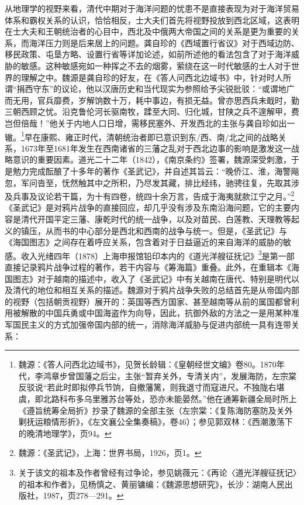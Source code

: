 \documentclass[a4paper, 12pt, openright]{ctexbook}
\begin{document}
从地理学的视野来看，清代中期对于海洋问题的忧患不是直接表现为对于海洋贸易体系和霸权关系的认识，恰恰相反，士大夫们首先将视野投放到西北区域，这表明在士大夫和王朝统治者的心目中，西北及中俄两大帝国之间的关系是更为重要的关系，而海洋压力则是后来居上的问题。龚自珍的《西域置行省议》对于西域边防、移民政策、屯垦方略、设置行省等详加论述，如前所述他的看法包含了对于海洋威胁的敏感。这种敏感宛如一种挥之不去的烟雾，萦绕在这一时代敏感的士人对于世界的理解之中。魏源是龚自珍的好友，在《答人问西北边域书》中，针对时人所谓“捐西守东”的议论，他以汉唐历史和当代现实为参照给予尖锐批驳：“或谓地广而无用，官兵靡费，岁解饷数十万，耗中事边，有损无益。曾亦思西兵未戢时，勤三朝西顾之忧。沿克鲁伦河长驱南牧，蹂至大同、归化城，甘陕之兵不遑解甲，费岂但倍哉！”他关于内地人口日增，需移民塞外、开发西北的主张与龚自珍如出一辙。\footnote{魏源：《答人问西北边域书》，见贺长龄辑：《皇朝经世文编》卷80。1870年代，李鸿章步曾国藩之后尘，主张“暂弃关外，专清关内”，发展海防，左宗棠反驳说“若此时即拟停兵节饷，自撤藩篱，则我退寸而寇进尺。不独陇右堪虞，即北路科布多乌里雅苏台等处，恐亦未能晏然。”他在通筹新疆全局时所上《遵旨统筹全局折》抄录了魏源的全部主张（左宗棠：《复陈海防塞防及关外剿抚运粮情形折》，《左文襄公全集奏稿》，卷46）；参见郭双林：《西潮激荡下的晚清地理学》，页94。}早在康熙、雍正时代，清朝统治者即已意识到东/西、南/北之间的战略关系，1673年至1681年发生在西南诸省的三藩之乱对于西北边事的影响是激发这一战略意识的重要因素。道光二十二年（1842），《南京条约》签署，魏源深受刺激，于是勉力完成酝酿了十多年的著作《圣武记》，并自述其旨云：“晚侨江、淮，海警飚忽，军问沓至，怃然触其中之所积，乃尽发其藏，排比经纬，驰骋往复，先取其涉及兵事及议论若干篇，为十有四卷，统四十余万言，告成于海夷就款江宁之月。”\footnote{魏源：《圣武记》，上海：世界书局，1926，页1。}《圣武记》是对鸦片战争的直接回应，却几乎没有涉及东南沿海问题，它的主要内容是清代开国平定三藩、康乾时代的统一战争，以及对苗民、白莲教、天理教等起义的镇压，从而书的中心部分是西北和西南的战争与统一。但是，《圣武记》与《海国图志》之间存在着呼应关系，包含着对于日益逼近的来自海洋的威胁的敏感。收入光绪四年（1878）上海申报馆铅印本内的《道光洋艘征抚记》\footnote{关于该文的祖本及作者曾经有过争论，参见姚薇元：《再论〈道光洋艘征抚记〉的祖本和作者》，见杨慎之、黄丽镛编：《魏源思想研究》，长沙：湖南人民出版社，1987，页278—291。}是第一部直接记录鸦片战争过程的著作，若干内容与《筹海篇》重叠。此外，在重辑本《海国图志》对于越南的描述中，收入了《圣武记》中有关越南在唐代、特别是明代以及清代的地位和相互关系的描述。魏源对于鸦片战争失败的总结首先是从帝国内部的视野（包括朝贡视野）展开的：英国等西方国家、甚至越南等从前的属国都曾利用被解散的中国兵勇或中国海盗作为向导，因此，抗御外敌的方法之一是用某种准军国民主义的方式加强帝国内部的统一，消除海洋威胁与促进内部统一具有连带关系：
\end{document}
